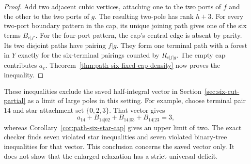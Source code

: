 \begin{proof}
Add two adjacent cubic vertices, attaching one to the two ports of $f$ and the other to the two ports of $g$.
The resulting two-pole has rank $h+3$.
For every two-port boundary pattern in the cap, its unique joining path gives one of the six terms $B_{e|f'}$.
For the four-port pattern, the cap's central edge is absent by parity.
Its two disjoint paths have pairing $f|g$.
They form one terminal path with a forest in $Y$ exactly for the six-terminal pairings counted by $R_{e|f|g}$.
The empty cap contributes $a_e$.
Theorem~\ref{thm:path-six-fixed-cap-density} now proves the inequality.
\end{proof}

These inequalities exclude the saved half-integral vector in Section~\ref{sec:six-cut-partial} as a limit of large poles in this setting.
For example, choose terminal pair $14$ and star attachment set $\{0,2,3\}$.
That vector gives
\[
 a_{14}+B_{14|02}+B_{14|03}+B_{14|23}=3,
\]
whereas Corollary~\ref{cor:path-six-star-cap} gives an upper limit of two.
The exact checker finds seven violated star inequalities and seven violated binary-tree inequalities for that vector.
This conclusion concerns the saved vector only.
It does not show that the enlarged relaxation has a strict universal deficit.
